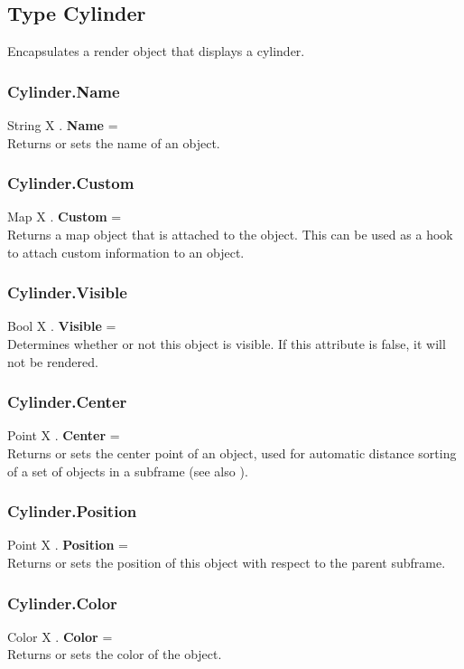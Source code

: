 \subsection{Type Cylinder \label{T:Cylinder}}
Encapsulates a render object that displays a cylinder.

\subsubsection{Cylinder.Name \label{F:Cylinder:Name}}
String X . \textbf{Name} = \\
Returns or sets the name of an object.

\subsubsection{Cylinder.Custom \label{F:Cylinder:Custom}}
Map X . \textbf{Custom} = \\
Returns a map object that is attached to the object. This can be used as a hook to attach custom information to an object.


\subsubsection{Cylinder.Visible \label{F:Cylinder:Visible}}
Bool X . \textbf{Visible} = \\
Determines whether or not this object is visible. If this attribute is false, it will not be rendered.

\subsubsection{Cylinder.Center \label{F:Cylinder:Center}}
Point X . \textbf{Center} = \\
Returns or sets the center point of an object, used for automatic distance sorting of a set of objects in a subframe (see also ).

\subsubsection{Cylinder.Position \label{F:Cylinder:Position}}
Point X . \textbf{Position} = \\
Returns or sets the position of this object with respect to the parent subframe.

\subsubsection{Cylinder.Color \label{F:Cylinder:Color}}
Color X . \textbf{Color} = \\
Returns or sets the color of the object.

